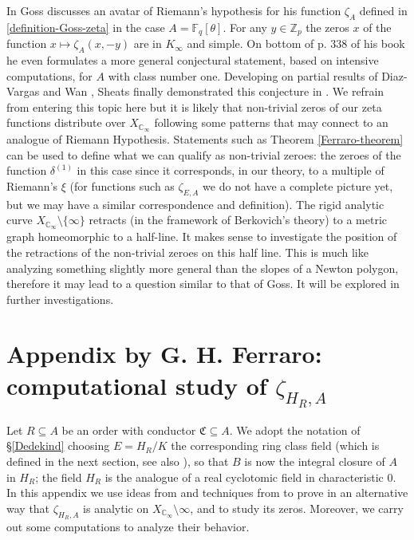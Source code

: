 \documentclass[11pt]{amsart}
\numberwithin{equation}{section}
\newcommand{\ZZ}{\mathbb{Z}}
\newcommand{\FF}{\mathbb{F}}
\newcommand{\CC}{\mathbb{C}}
\begin{document}
In \cite[\S 8.24]{GOS} Goss discusses an avatar of Riemann's hypothesis for his function $\zeta_A$ defined in \eqref{definition-Goss-zeta} in the case $A=\FF_q[\theta]$. For any $y\in\ZZ_p$ the zeros $x$ of the function $x\mapsto \zeta_A(x,-y)$
are in $K_\infty$ and simple. On bottom of p. 338 of his book he even formulates a more general conjectural statement, based on intensive computations, for $A$ with class number one. Developing on partial results of Diaz-Vargas \cite{DIA} and Wan \cite{WAN}, Sheats finally demonstrated this conjecture in \cite{SHE}. We refrain from entering this topic here but it is likely that 
non-trivial zeros of our zeta functions distribute over $X_{\CC_\infty}$ following some patterns that may connect to an analogue of Riemann Hypothesis. Statements such as Theorem \ref{Ferraro-theorem} can be used to define what we can qualify as non-trivial zeroes: the zeroes of the function $\delta^{(1)}$ in this case since it corresponds, in our theory, to a multiple of Riemann's $\xi$ (for functions such as $\zeta_{E,A}$ we do not have a complete picture yet, but we may have a similar correspondence and definition). The rigid analytic curve $X_{\CC_\infty}\setminus\{\infty\}$ retracts (in the framework of Berkovich's theory) to a metric graph homeomorphic to a half-line. It makes sense to investigate the position of the retractions of the non-trivial zeroes on this half line. This is much like analyzing something slightly more general than the slopes of a Newton polygon,
therefore it may lead to a question similar to that of Goss. It will be explored in further investigations.

\section{Appendix by G. H. Ferraro: computational study of $\zeta_{H_R,A}$}\label{Appendix}

Let $R\subseteq A$ be an order with conductor $\mathfrak{C}\subseteq A$. We adopt the notation of \S \ref{Dedekind} choosing $E=H_R/K$ the corresponding ring class field (which is defined in the next section, see also \cite{Hayes}), so that $B$ is now the integral closure of $A$ in $H_R$; the field $H_R$ is the analogue of a real cyclotomic field in characteristic $0$. In this appendix we use ideas from \cite{ANG&NGO&TAV} and techniques from \cite{FER1} to prove in an alternative way that $\zeta_{H_R,A}$ is analytic on $X_{\CC_\infty}\setminus\infty$, and to study its zeros. Moreover, we carry out some computations to analyze their behavior.
\end{document}

